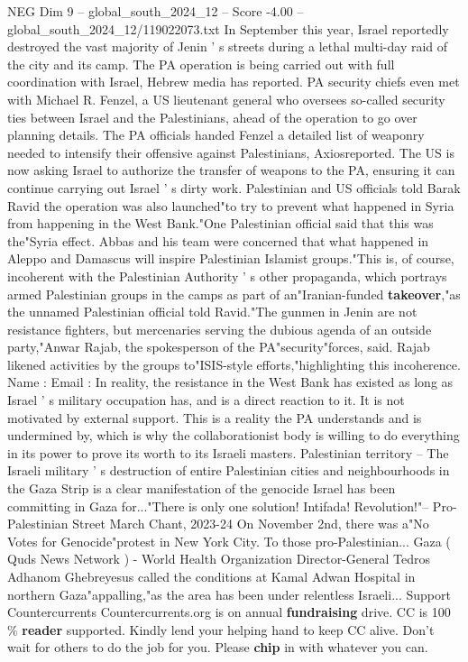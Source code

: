 \begin{textsample}{NEG Dim 9 – global\_south\_2024\_12 – Score -4.00 – global\_south\_2024\_12/119022073.txt}
In September this year, Israel reportedly destroyed the vast majority of Jenin ' s streets during a lethal multi-day raid of the city and its camp.
The PA operation is being carried out with full coordination with Israel, Hebrew media has reported.
PA security chiefs even met with Michael R.
Fenzel, a US lieutenant general who oversees so-called security ties between Israel and the Palestinians, ahead of the operation to go over planning details.
The PA officials handed Fenzel a detailed list of weaponry needed to intensify their offensive against Palestinians, Axiosreported.
The US is now asking Israel to authorize the transfer of weapons to the PA, ensuring it can continue carrying out Israel ' s dirty work.
Palestinian and US officials told Barak Ravid the operation was also launched"to try to prevent what happened in Syria from happening in the West Bank."One Palestinian official said that this was the"Syria effect.
Abbas and his team were concerned that what happened in Aleppo and Damascus will inspire Palestinian Islamist groups."This is, of course, incoherent with the Palestinian Authority ' s other propaganda, which portrays armed Palestinian groups in the camps as part of an"Iranian-funded \textbf{takeover},"as the unnamed Palestinian official told Ravid."The gunmen in Jenin are not resistance fighters, but mercenaries serving the dubious agenda of an outside party,"Anwar Rajab, the spokesperson of the PA"security"forces, said.
Rajab likened activities by the groups to"ISIS-style efforts,"highlighting this incoherence.
Name : Email : In reality, the resistance in the West Bank has existed as long as Israel ' s military occupation has, and is a direct reaction to it.
It is not motivated by external support.
This is a reality the PA understands and is undermined by, which is why the collaborationist body is willing to do everything in its power to prove its worth to its Israeli masters.
Palestinian territory -- The Israeli military ' s destruction of entire Palestinian cities and neighbourhoods in the Gaza Strip is a clear manifestation of the genocide Israel has been committing in Gaza for..."There is only one solution!
Intifada!
Revolution!"-- Pro-Palestinian Street March Chant, 2023-24 On November 2nd, there was a"No Votes for Genocide"protest in New York City.
To those pro-Palestinian...
Gaza ( Quds News Network ) - World Health Organization Director-General Tedros Adhanom Ghebreyesus called the conditions at Kamal Adwan Hospital in northern Gaza"appalling,"as the area has been under relentless Israeli...
Support Countercurrents Countercurrents.org is on annual \textbf{fundraising} drive.
CC is 100 \% \textbf{reader} supported.
Kindly lend your helping hand to keep CC alive.
Don't wait for others to do the job for you.
Please \textbf{chip} in with whatever you can.

\end{textsample}

